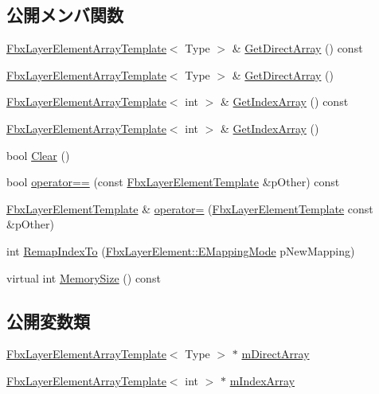 \subsection*{公開メンバ関数}
\begin{DoxyCompactItemize}
\item 
\hyperlink{class_fbx_layer_element_array_template}{Fbx\+Layer\+Element\+Array\+Template}$<$ Type $>$ \& \hyperlink{class_fbx_layer_element_template_a42afd6d78d902570d7b2724cb0336226}{Get\+Direct\+Array} () const
\item 
\hyperlink{class_fbx_layer_element_array_template}{Fbx\+Layer\+Element\+Array\+Template}$<$ Type $>$ \& \hyperlink{class_fbx_layer_element_template_ad34f79d4abaa1d101cc756048a5f11b9}{Get\+Direct\+Array} ()
\item 
\hyperlink{class_fbx_layer_element_array_template}{Fbx\+Layer\+Element\+Array\+Template}$<$ int $>$ \& \hyperlink{class_fbx_layer_element_template_ab1494495d1944eb4b20c4c97abd6358c}{Get\+Index\+Array} () const
\item 
\hyperlink{class_fbx_layer_element_array_template}{Fbx\+Layer\+Element\+Array\+Template}$<$ int $>$ \& \hyperlink{class_fbx_layer_element_template_a299f160a392be9be520df2d0a1275fc8}{Get\+Index\+Array} ()
\item 
bool \hyperlink{class_fbx_layer_element_template_abe029dd81aa956b415b9534aa3536bf0}{Clear} ()
\item 
bool \hyperlink{class_fbx_layer_element_template_a2519d2a629f652904ff64840e0c45780}{operator==} (const \hyperlink{class_fbx_layer_element_template}{Fbx\+Layer\+Element\+Template} \&p\+Other) const
\item 
\hyperlink{class_fbx_layer_element_template}{Fbx\+Layer\+Element\+Template} \& \hyperlink{class_fbx_layer_element_template_ab92b474682b154297b72188986684fd7}{operator=} (\hyperlink{class_fbx_layer_element_template}{Fbx\+Layer\+Element\+Template} const \&p\+Other)
\item 
int \hyperlink{class_fbx_layer_element_template_a971c29199bb9f0674045d2510230010a}{Remap\+Index\+To} (\hyperlink{class_fbx_layer_element_a5a40e95db30ae9f94611dc3f1568af26}{Fbx\+Layer\+Element\+::\+E\+Mapping\+Mode} p\+New\+Mapping)
\item 
virtual int \hyperlink{class_fbx_layer_element_template_aa6a7b5ed38b51d4a903f9ed2e715ee79}{Memory\+Size} () const
\end{DoxyCompactItemize}
\subsection*{公開変数類}
\begin{DoxyCompactItemize}
\item 
\hyperlink{class_fbx_layer_element_array_template}{Fbx\+Layer\+Element\+Array\+Template}$<$ Type $>$ $\ast$ \hyperlink{class_fbx_layer_element_template_a0c7242aa361d91031b5137fbece371f3}{m\+Direct\+Array}
\item 
\hyperlink{class_fbx_layer_element_array_template}{Fbx\+Layer\+Element\+Array\+Template}$<$ int $>$ $\ast$ \hyperlink{class_fbx_layer_element_template_a4aa88a6936b2ab08e150ff6336a91a7d}{m\+Index\+Array}
\end{DoxyCompactItemize}
